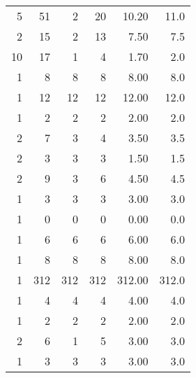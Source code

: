 \begin{tabular}{rrrrrr}
         5 &          51 &    2 &   20 &  10.20 &     11.0 \\
         2 &          15 &    2 &   13 &   7.50 &      7.5 \\
        10 &          17 &    1 &    4 &   1.70 &      2.0 \\
         1 &           8 &    8 &    8 &   8.00 &      8.0 \\
         1 &          12 &   12 &   12 &  12.00 &     12.0 \\
         1 &           2 &    2 &    2 &   2.00 &      2.0 \\
         2 &           7 &    3 &    4 &   3.50 &      3.5 \\
         2 &           3 &    3 &    3 &   1.50 &      1.5 \\
         2 &           9 &    3 &    6 &   4.50 &      4.5 \\
         1 &           3 &    3 &    3 &   3.00 &      3.0 \\
         1 &           0 &    0 &    0 &   0.00 &      0.0 \\
         1 &           6 &    6 &    6 &   6.00 &      6.0 \\
         1 &           8 &    8 &    8 &   8.00 &      8.0 \\
         1 &         312 &  312 &  312 & 312.00 &    312.0 \\
         1 &           4 &    4 &    4 &   4.00 &      4.0 \\
         1 &           2 &    2 &    2 &   2.00 &      2.0 \\
         2 &           6 &    1 &    5 &   3.00 &      3.0 \\
         1 &           3 &    3 &    3 &   3.00 &      3.0 \\
\bottomrule
\end{tabular}
